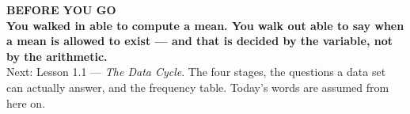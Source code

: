 \documentclass[aspectratio=169, 11pt]{beamer}
\begin{document}
{
\begin{frame}[plain]
  \vspace{1.5cm}\hspace{0.8cm}%
  \begin{minipage}{0.86\textwidth}
    {\color{goldacc}\bfseries\small BEFORE YOU GO}\\[0.7cm]
    {\color{white}\bfseries\Large You walked in able to compute a mean. You walk out able to
    say when a mean is allowed to exist --- and that is decided by the variable, not by the
    arithmetic.}\\[0.9cm]
    {\color{frostmid}\small Next: Lesson 1.1 --- \emph{The Data Cycle}. The four stages, the
    questions a data set can actually answer, and the frequency table. Today's words are
    assumed from here on.}
  \end{minipage}
\end{frame}
}
\end{document}
